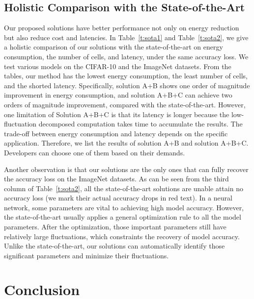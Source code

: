 \documentclass[10pt,journal,compsoc]{IEEEtran}
\begin{document}
\subsection{Holistic Comparison with the State-of-the-Art}

Our proposed solutions have better performance not only on energy reduction but also reduce cost and latencies. In Table~\ref{t:sota1} and Table~\ref{t:sota2}, we give a holistic comparison of our solutions with the state-of-the-art on energy consumption, the number of cells, and latency, under the same accuracy loss. We test various models on the CIFAR-10 and the ImageNet datasets. From the tables, our method has the lowest energy consumption, the least number of cells, and the shorted latency. Specifically, solution A+B shows one order of magnitude improvement in energy consumption, and solution A+B+C can achieve two orders of magnitude improvement, compared with the state-of-the-art. However, one limitation of Solution A+B+C is that its latency is longer because the low-fluctuation decomposed computation takes time to accumulate the results. The trade-off between energy consumption and latency depends on the specific application. Therefore, we list the results of solution A+B and solution A+B+C. Developers can choose one of them based on their demands.

Another observation is that our solutions are the only ones that can fully recover the accuracy loss on the ImageNet datasets. As can be seen from the third column of Table~\ref{t:sota2}, all the state-of-the-art solutions are unable attain no accuracy loss (we mark their actual accuracy drops in red text). In a neural network, some parameters are vital to achieving high model accuracy. However, the state-of-the-art usually applies a general optimization rule to all the model parameters. After the optimization, those important parameters still have relatively large fluctuations, which constraints the recovery of model accuracy. Unlike the state-of-the-art, our solutions can automatically identify those significant parameters and minimize their fluctuations. %

\section{Conclusion}
\label{s6}
\end{document}
